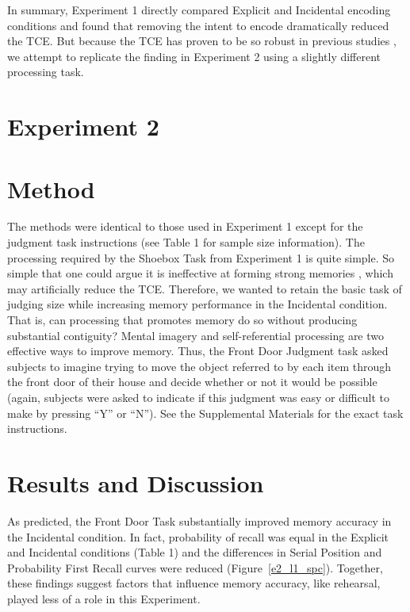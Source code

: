 \documentclass[man,natbib,floatsintext]{apa6} %
\begin{document}
In summary, Experiment 1 directly compared Explicit and Incidental encoding conditions and found that removing the intent to encode dramatically reduced the TCE. \color{black} But because the TCE has proven to be so robust in previous studies \citep{HealKaha17}, we attempt to replicate the finding in Experiment 2 using a slightly different processing task.




\section{Experiment 2}
\section{Method}

The methods were identical to those used in Experiment 1 except for the judgment task instructions (see Table 1 for sample size information).
The processing required by the Shoebox Task from Experiment 1 is quite simple. So simple that one could argue it is  ineffective at forming strong memories \label{newcite}\citep{EaglLeit64}, which may artificially reduce the TCE. Therefore, we wanted to retain the basic task of judging size while increasing memory performance in the Incidental condition. That is, can processing that promotes memory do so without producing substantial contiguity? Mental imagery and self-referential processing are two effective ways to improve memory. Thus, the Front Door Judgment task asked subjects to imagine trying to move the object referred to by each item through the front door of their house and decide whether or not it would be possible (again, subjects were asked to indicate if this judgment was easy or difficult to make by pressing ``Y'' or ``N''). See the Supplemental Materials for the exact task instructions.

\section{Results and Discussion}
As predicted, the Front Door Task substantially improved memory accuracy in the Incidental condition. In fact, probability of recall was equal in the Explicit and Incidental conditions (Table 1) \color{red} and the differences in Serial Position and Probability First Recall curves were reduced (Figure~\ref{e2_l1_spc}). Together, these findings suggest factors that influence memory accuracy, like rehearsal, played less of a role in this Experiment.
\end{document}
